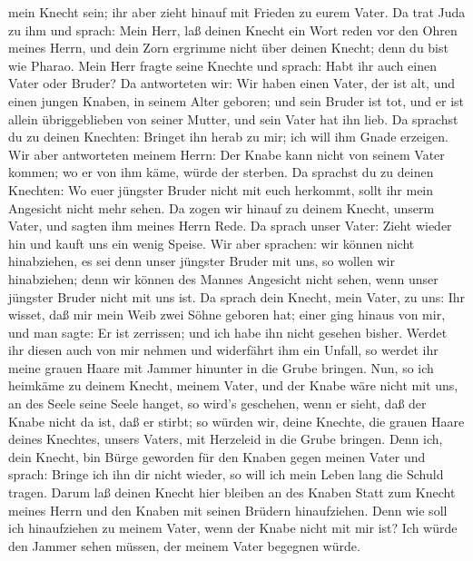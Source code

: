 mein Knecht sein; ihr aber zieht hinauf mit Frieden zu eurem Vater.
 Da trat Juda zu ihm und sprach: Mein Herr, laß deinen
Knecht ein Wort reden vor den Ohren meines Herrn, und dein Zorn ergrimme
nicht über deinen Knecht; denn du bist wie Pharao.  Mein
Herr fragte seine Knechte und sprach: Habt ihr auch einen Vater oder
Bruder?  Da antworteten wir: Wir haben einen Vater, der ist
alt, und einen jungen Knaben, in seinem Alter geboren; und sein Bruder
ist tot, und er ist allein übriggeblieben von seiner Mutter, und sein
Vater hat ihn lieb.  Da sprachst du zu deinen Knechten:
Bringet ihn herab zu mir; ich will ihm Gnade erzeigen.  Wir
aber antworteten meinem Herrn: Der Knabe kann nicht von seinem Vater
kommen; wo er von ihm käme, würde der sterben.  Da sprachst
du zu deinen Knechten: Wo euer jüngster Bruder nicht mit euch herkommt,
sollt ihr mein Angesicht nicht mehr sehen.  Da zogen wir
hinauf zu deinem Knecht, unserm Vater, und sagten ihm meines Herrn Rede.
 Da sprach unser Vater: Zieht wieder hin und kauft uns ein
wenig Speise.  Wir aber sprachen: wir können nicht
hinabziehen, es sei denn unser jüngster Bruder mit uns, so wollen wir
hinabziehen; denn wir können des Mannes Angesicht nicht sehen, wenn
unser jüngster Bruder nicht mit uns ist.  Da sprach dein
Knecht, mein Vater, zu uns: Ihr wisset, daß mir mein Weib zwei Söhne
geboren hat;  einer ging hinaus von mir, und man sagte: Er
ist zerrissen; und ich habe ihn nicht gesehen bisher. 
Werdet ihr diesen auch von mir nehmen und widerfährt ihm ein Unfall, so
werdet ihr meine grauen Haare mit Jammer hinunter in die Grube bringen.
 Nun, so ich heimkäme zu deinem Knecht, meinem Vater, und
der Knabe wäre nicht mit uns, an des Seele seine Seele hanget,
 so wird's geschehen, wenn er sieht, daß der Knabe nicht da
ist, daß er stirbt; so würden wir, deine Knechte, die grauen Haare
deines Knechtes, unsers Vaters, mit Herzeleid in die Grube bringen.
 Denn ich, dein Knecht, bin Bürge geworden für den Knaben
gegen meinen Vater und sprach: Bringe ich ihn dir nicht wieder, so will
ich mein Leben lang die Schuld tragen.  Darum laß deinen
Knecht hier bleiben an des Knaben Statt zum Knecht meines Herrn und den
Knaben mit seinen Brüdern hinaufziehen.  Denn wie soll ich
hinaufziehen zu meinem Vater, wenn der Knabe nicht mit mir ist? Ich
würde den Jammer sehen müssen, der meinem Vater begegnen würde.

